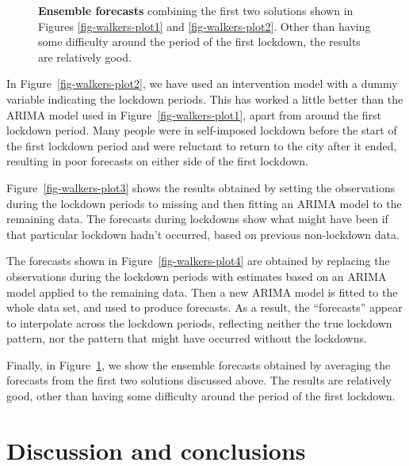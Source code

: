 \documentclass[
  11pt,
  a4paper,
]{article}
\begin{document}
\begin{figure}


\caption{\label{fig-walkers-ensemble-plot}\textbf{Ensemble forecasts}
combining the first two solutions shown in Figures
\ref{fig-walkers-plot1} and \ref{fig-walkers-plot2}. Other than having
some difficulty around the period of the first lockdown, the results are
relatively good.}

\end{figure}%

In Figure~\ref{fig-walkers-plot2}, we have used an intervention model
with a dummy variable indicating the lockdown periods. This has worked a
little better than the ARIMA model used in
Figure~\ref{fig-walkers-plot1}, apart from around the first lockdown
period. Many people were in self-imposed lockdown before the start of
the first lockdown period and were reluctant to return to the city after
it ended, resulting in poor forecasts on either side of the first
lockdown.

Figure~\ref{fig-walkers-plot3} shows the results obtained by setting the
observations during the lockdown periods to missing and then fitting an
ARIMA model to the remaining data. The forecasts during lockdowns show
what might have been if that particular lockdown hadn't occurred, based
on previous non-lockdown data.

The forecasts shown in Figure~\ref{fig-walkers-plot4} are obtained by
replacing the observations during the lockdown periods with estimates
based on an ARIMA model applied to the remaining data. Then a new ARIMA
model is fitted to the whole data set, and used to produce forecasts. As
a result, the ``forecasts'' appear to interpolate across the lockdown
periods, reflecting neither the true lockdown pattern, nor the pattern
that might have occurred without the lockdowns.

Finally, in Figure~\ref{fig-walkers-ensemble-plot}, we show the ensemble
forecasts obtained by averaging the forecasts from the first two
solutions discussed above. The results are relatively good, other than
having some difficulty around the period of the first lockdown.

\section{Discussion and conclusions}\label{sec-conclusions}
\end{document}
